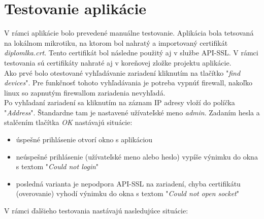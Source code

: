 \section{Testovanie aplikácie}
V rámci aplikácie bolo prevedené manuálne testovanie. Aplikácia bola tetsovaná na lokálnom mikrotiku, na ktorom bol nahratý a importovaný certifikát \textit{diplomlka.crt}. Tento certifikát bol následne použitý aj v službe API-SSL. V rámci testovania sú certifikáty nahraté aj v koreňovej zložke projektu aplikácie.\\
Ako prvé bolo otestované vyhľadávanie zariadení kliknutím na tlačítko "\textit{find devices}". Pre funkčnosť tohoto vyhľadávania je potreba vypnúť firewall, nakoľko linux so zapnutým firewallom zariadenia nevyhľadá.\\
Po vyhľadaní zariadení sa kliknutím na záznam IP adresy vloží do políčka "\textit{Address}". Štandardne tam je nastavené užívateľské meno \textit{admin}. Zadaním hesla a stalčením tlačítka \textit{OK} nastávajú situácie:
\begin{itemize}
\item úspešné prihlásenie otvorí okno s aplikáciou
\item neúspešné prihlásenie (užívateľské meno alebo heslo) vypíše výnimku do okna s textom "\textit{Could not login}"
\item posledná varianta je nepodpora API-SSL na zariadení, chyba certifikátu (overovanie) vyhodí výnimku do okna s textom "\textit{Could not open socket}"
\end{itemize}  
V rámci ďalšieho testovania nastávajú nasledujúce situácie:
